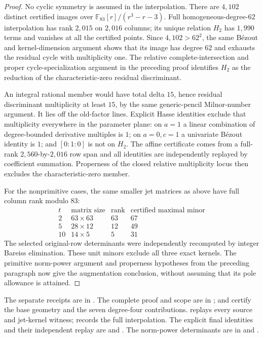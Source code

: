 \begin{proof}
No cyclic symmetry is assumed in the interpolation. There are $4,102$
distinct certified images over
$\mathbb F_{83}[r]/(r^3-r-3)$. Full homogeneous-degree-$62$
interpolation has rank $2,015$ on $2,016$ columns; its unique relation
$H_2$ has $1,990$ terms and vanishes at all the certified points.
Since $4,102>62^2$, the same B\'ezout and kernel-dimension argument shows
that its image has degree $62$ and exhausts the residual cycle with
multiplicity one. The relative complete-intersection and proper
cycle-specialization argument in the preceding proof identifies $H_2$
as the reduction of the characteristic-zero residual discriminant.

An integral rational member would have total delta $15$, hence residual
discriminant multiplicity at least $15$, by the same generic-pencil
Milnor-number argument. It lies off the old-factor lines. Explicit
Hasse identities exclude that multiplicity everywhere in the parameter
plane: on $a=1$ a linear combination of degree-bounded derivative
multiples is $1$; on $a=0,c=1$ a univariate B\'ezout identity is $1$;
and $[0:1:0]$ is not on $H_2$. The affine certificate comes from a
full-rank $2,560$-by-$2,016$ row span and all identities are independently
replayed by coefficient summation. Properness of the closed relative
multiplicity locus then excludes the characteristic-zero member.

For the nonprimitive cases, the same smaller jet matrices as above have
full column rank modulo $83$:
\[
\begin{array}{c|c|c|c}
 t&\text{matrix size}&\text{rank}&\text{certified maximal minor}\\\hline
 2&63\mathbin{\times}63&63&67\\
 5&28\mathbin{\times}12&12&49\\
 10&14\mathbin{\times}5&5&31
\end{array}
\]
The selected original-row determinants were independently recomputed
by integer Bareiss elimination. These unit minors exclude all three
exact kernels. The primitive norm-power argument and properness
hypotheses from the preceding paragraph now give the augmentation
conclusion, without assuming that its pole allowance is attained.
\end{proof}

The separate receipts are in
.
The complete proof and scope are in ;
 and  certify the base
geometry and the seven degree-four contributions.
 replays every source and jet-kernel
witness;  records the full
interpolation. The explicit final identities and their independent
replay are  and
.
The norm-power determinants are in 
and .
